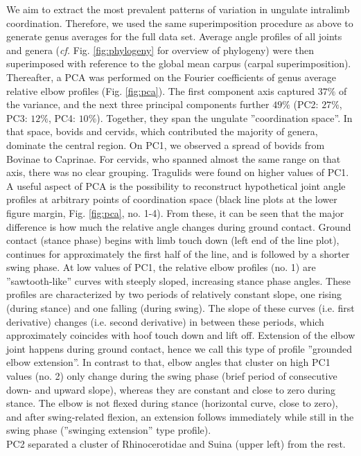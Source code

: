 \documentclass[10pt, a4paper]{article}
\begin{document}
\begin{linenumbers}[1]
We aim to extract the most prevalent patterns of variation in ungulate intralimb coordination. 
Therefore, we used the same superimposition procedure as above to generate genus averages for the full data set. 
Average angle profiles of all joints and genera (\textit{cf.} Fig. \ref{fig:phylogeny} for overview of phylogeny) were  then superimposed with reference to the global mean carpus (carpal superimposition). 
Thereafter, a PCA was performed on the Fourier coefficients of genus average relative elbow profiles (Fig. \ref{fig:pca}). 
The first component axis captured $37\%$ of the variance, and the next three principal components further $49\%$ (PC2: $27\%$, PC3: $12\%$, PC4: $10\%$). 
Together, they span the ungulate ''coordination space''. 
In that space, bovids and cervids, which contributed the majority of genera, dominate the central region. 
On PC1, we observed a spread of bovids from {Bovinae} to {Caprinae}. 
For cervids, who spanned almost the same range on that axis, there was no clear grouping. 
Tragulids were found on higher values of PC1. 
A useful aspect of PCA is the possibility to reconstruct hypothetical joint angle profiles at arbitrary points of coordination space (black line plots at the lower figure margin, Fig. \ref{fig:pca}, no. 1-4). 
From these, it can be seen that the major difference is how much the relative angle changes during ground contact. 
Ground contact (stance phase) begins with limb touch down (left end of the line plot), continues for approximately the first half of the line, and is followed by a shorter swing phase. 
At low values of PC1, the relative elbow profiles (no. 1) are ''sawtooth-like'' curves with steeply sloped, increasing stance phase angles. 
These profiles are characterized by two periods of relatively constant slope, one rising (during stance) and one falling (during swing). 
The slope of these curves (i.e. first derivative) changes (i.e. second derivative) in between these periods, which approximately coincides with hoof touch down and lift off. 
Extension of the elbow joint happens during ground contact, hence we call this type of profile ''grounded elbow extension''. 
In contrast to that, elbow angles that cluster on high PC1 values (no. 2) only change during the swing phase (brief period of consecutive down- and upward slope), whereas they are constant and close to zero during stance. 
The elbow is not flexed during stance (horizontal curve, close to zero), and after swing-related flexion, an extension follows immediately while still in the swing phase (''swinging extension'' type profile). 
\\PC2 separated a cluster of Rhinocerotidae and Suina (upper left) from the rest. 

\end{linenumbers}
\end{document}
